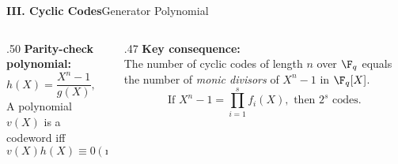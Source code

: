 \begin{frame}{\textbf{III. Cyclic Codes}}{Generator Polynomial}


\medskip
\begin{columns}[T]
  \begin{column}{.50\textwidth}
    \textbf{Parity-check polynomial:}
    \[h(X)=\frac{X^n-1}{g(X)},\qquad \deg h = k\]
    A polynomial $v(X)$ is a codeword iff
    \[v(X)h(X)\equiv 0\pmod{X^n-1}.\]
  \end{column}
  \begin{column}{.47\textwidth}
    \textbf{Key consequence:}\\[4pt]
    The number of cyclic codes of length $n$ over $\F_q$ equals the number of \emph{monic divisors} of $X^n-1$ in $\F_q[X]$.
    \[\text{If }X^n-1 = \prod_{i=1}^s f_i(X),\text{ then }2^s\text{ codes}.\]
  \end{column}
\end{columns}
\end{frame}

